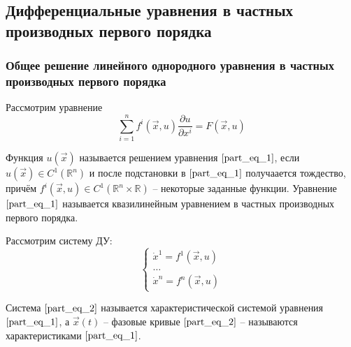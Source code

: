 \subsection{Дифференциальные уравнения в частных производных первого порядка}

\subsubsection{Общее решение линейного однородного уравнения в частных производных первого порядка}

\begin{definition}
    Рассмотрим уравнение
    \begin{equation}
        \sum \limits_{i = 1}^{n} f^{i} \left( \overrightarrow{x}, u \right) \frac{\partial u}{\partial x^{i}} = F \left( \overrightarrow{x}, u \right)
        \label{part_eq_1}
    \end{equation}

    Функция $u \left( \overrightarrow{x} \right)$ называется решением уравнения $\eqref{part_eq_1}$, если $u \left( \overrightarrow{x} \right) \in C^{1} \left( \mathbb{R}^n \right)$ и после подстановки в $\eqref{part_eq_1}$ получаается тождество, причём $f^{i} \left( \overrightarrow{x}, u \right) \in C^{1} \left( \mathbb{R}^n \times \mathbb{R} \right)$ -- некоторые заданные функции. Уравнение $\eqref{part_eq_1}$ называется квазилинейным уравнением в частных производных первого порядка. 
\end{definition}

\begin{definition}
    Рассмотрим систему ДУ:
    \begin{equation}
        \begin{cases}
            \dot{x}^1 = f^1 \left( \overrightarrow{x}, u \right) \\
            \dots                                                \\
            \dot{x}^n = f^n \left( \overrightarrow{x}, u \right)
        \end{cases}
        \label{part_eq_2}
    \end{equation}

    Система $\eqref{part_eq_2}$ называется характеристической системой уравнения $\eqref{part_eq_1}$, а $\overrightarrow{x} \left( t \right) $ -- фазовые кривые $\eqref{part_eq_2}$ -- называются характеристиками $\eqref{part_eq_1}$.
\end{definition}

